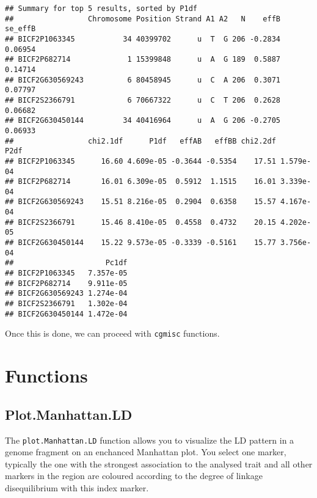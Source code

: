 \documentclass[12pt,a4paper,oneside]{article}
\begin{document}
\begin{knitrout}\footnotesize
{}\color{fgcolor}\begin{kframe}
\begin{alltt}
  \hlstd{=} \hlstd{)}
\end{alltt}
\begin{verbatim}
## Summary for top 5 results, sorted by P1df
##                 Chromosome Position Strand A1 A2   N    effB se_effB
## BICF2P1063345           34 40399702      u  T  G 206 -0.2834 0.06954
## BICF2P682714             1 15399848      u  A  G 189  0.5887 0.14714
## BICF2G630569243          6 80458945      u  C  A 206  0.3071 0.07797
## BICF2S2366791            6 70667322      u  C  T 206  0.2628 0.06682
## BICF2G630450144         34 40416964      u  A  G 206 -0.2705 0.06933
##                 chi2.1df      P1df   effAB   effBB chi2.2df      P2df
## BICF2P1063345      16.60 4.609e-05 -0.3644 -0.5354    17.51 1.579e-04
## BICF2P682714       16.01 6.309e-05  0.5912  1.1515    16.01 3.339e-04
## BICF2G630569243    15.51 8.216e-05  0.2904  0.6358    15.57 4.167e-04
## BICF2S2366791      15.46 8.410e-05  0.4558  0.4732    20.15 4.202e-05
## BICF2G630450144    15.22 9.573e-05 -0.3339 -0.5161    15.77 3.756e-04
##                     Pc1df
## BICF2P1063345   7.357e-05
## BICF2P682714    9.911e-05
## BICF2G630569243 1.274e-04
## BICF2S2366791   1.302e-04
## BICF2G630450144 1.472e-04
\end{verbatim}
\end{kframe}
\end{knitrout}


\noindent Once this is done, we can proceed with \texttt{cgmisc} functions.

\newpage

\section*{Functions}
\subsection*{Plot.Manhattan.LD}
\noindent The \texttt{plot.Manhattan.LD} function allows you to visualize the LD pattern in a genome fragment on an enchanced Manhattan plot. You select one marker, typically the one with the strongest association to the analysed trait and all other markers in the region are coloured according to the degree of linkage disequilibrium with this index marker. 
\end{document}
